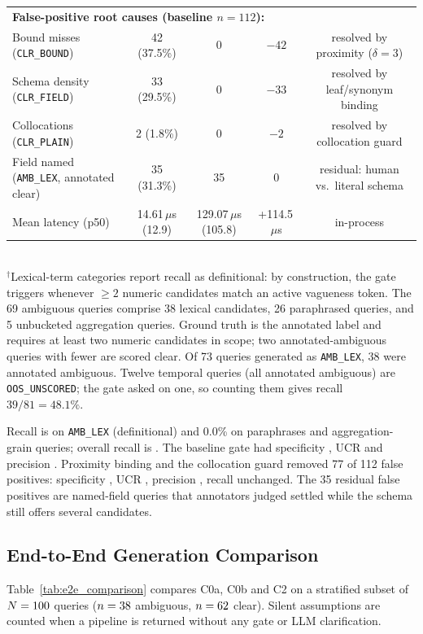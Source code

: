 \begin{table}[t]
\begin{tabular}{lcccc}
\midrule
\multicolumn{5}{l}{\textbf{False-positive root causes (baseline $n{=}112$):}} \\
\quad Bound misses (\texttt{CLR\_BOUND}) & 42 (37.5\%) & 0 & $-42$ & resolved by proximity ($\delta{=}3$) \\
\quad Schema density (\texttt{CLR\_FIELD}) & 33 (29.5\%) & 0 & $-33$ & resolved by leaf/synonym binding \\
\quad Collocations (\texttt{CLR\_PLAIN}) & 2 (1.8\%) & 0 & $-2$ & resolved by collocation guard \\
\quad Field named (\texttt{AMB\_LEX}, annotated clear) & 35 (31.3\%) & 35 & 0 & residual: human vs.\ literal schema \\
\midrule
Mean latency (p50) & 14.61\,$\mu$s (12.9) & 129.07\,$\mu$s (105.8) & +114.5\,$\mu$s & in-process \\
\bottomrule
\end{tabular}
\\[2pt]
\footnotesize{$^{\dagger}$Lexical-term categories report recall as definitional: by construction, the gate triggers whenever $\ge 2$ numeric candidates match an active vagueness token. The 69 ambiguous queries comprise 38 lexical candidates, 26 paraphrased queries, and 5 unbucketed aggregation queries. Ground truth is the annotated label and requires at least two numeric candidates in scope; two annotated-ambiguous queries with fewer are scored clear. Of 73 queries generated as \texttt{AMB\_LEX}, 38 were annotated ambiguous. Twelve temporal queries (all annotated ambiguous) are \texttt{OOS\_UNSCORED}; the gate asked on one, so counting them gives recall $39/81 = 48.1\%$.}
\end{table}

Recall is \gateRecallLexical{} on \texttt{AMB\_LEX} (definitional) and 0.0\% on paraphrases and aggregation-grain queries; overall recall is \gateRecallOverall{}. The baseline gate had specificity \gateBaseSpecificity{}, UCR \gateBaseUCR{} and precision \gateBasePrecision{}. Proximity binding and the collocation guard removed 77 of 112 false positives: specificity \gateSpecificity{}, UCR \gateUCR{}, precision \gatePrecision{}, recall unchanged. The 35 residual false positives are named-field queries that annotators judged settled while the schema still offers several candidates.

\subsection{End-to-End Generation Comparison}
Table~\ref{tab:e2e_comparison} compares C0a, C0b and C2 on a stratified subset of $N = 100{}$ queries ($n = 38{}$ ambiguous, $n = 62{}$ clear). Silent assumptions are counted when a pipeline is returned without any gate or LLM clarification.


